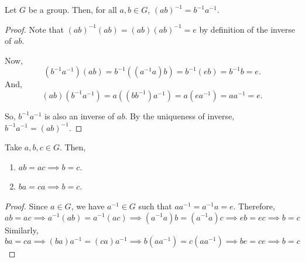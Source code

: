 \documentclass[11pt]{penrose}
\begin{document}
\begin{nthm}
    Let $G$ be a group. Then, for all $a, b \in G$, $(ab)^{-1} = b^{-1} a^{-1}$.
\end{nthm}
\begin{proof}
    Note that $(ab)^{-1} (ab) = (ab) (ab)^{-1} = e$ by definition of the inverse of $ab$.

    Now,
    \begin{equation*}
        (b^{-1} a^{-1}) (a b)
        = b^{-1} ((a^{-1} a) b)
        = b^{-1} (e b)
        = b^{-1} b
        = e.
    \end{equation*}
    And,
    \begin{equation*}
        (a b) (b^{-1} a^{-1})
        = a ((b b^{-1}) a^{-1})
        = a (e a^{-1})
        = a a^{-1}
        = e.
    \end{equation*}

    So, $b^{-1} a^{-1}$ is also an inverse of $ab$. By the uniqueness of inverse, $b^{-1} a^{-1} = (ab)^{-1}$.
\end{proof}

\begin{nthm}
    Take $a, b, c \in G$. Then,
    \begin{enumerate}
        \item $ab = ac \implies b = c$.
        \item $ba = ca \implies b = c$.
    \end{enumerate}
\end{nthm}
\begin{proof}
    Since $a \in G$, we have $a^{-1} \in G$ such that $a a^{-1} = a^{-1} a = e$. Therefore,
    \begin{equation*}
        ab = ac
        \implies a^{-1} (ab) = a^{-1} (ac)
        \implies (a^{-1} a)b = (a^{-1} a)c
        \implies eb = ec
        \implies b = c
    \end{equation*}
    Similarly,
    \begin{equation*}
        ba = ca
        \implies (ba)a^{-1} = (ca)a^{-1}
        \implies b (a a^{-1}) = c (a a^{-1})
        \implies be = ce
        \implies b = c
    \end{equation*}
\end{proof}
\end{document}
